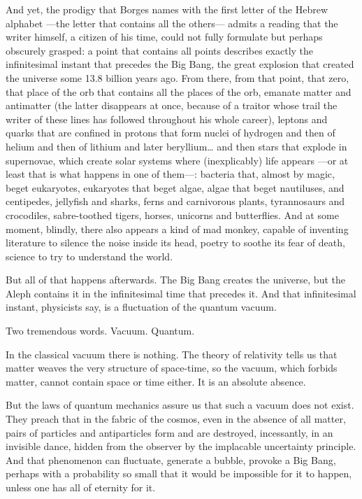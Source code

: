 \documentclass[11pt,a4paper]{article}
\begin{document}
And yet, the prodigy that Borges names with the first letter of the Hebrew alphabet ---the letter that contains all the others--- admits a reading that the writer himself, a citizen of his time, could not fully formulate but perhaps obscurely grasped: a point that contains all points describes exactly the infinitesimal instant that precedes the Big Bang, the great explosion that created the universe some 13.8 billion years ago. From there, from that point, that zero, that place of the orb that contains all the places of the orb, emanate matter and antimatter (the latter disappears at once, because of a traitor whose trail the writer of these lines has followed throughout his whole career), leptons and quarks that are confined in protons that form nuclei of hydrogen and then of helium and then of lithium and later beryllium… and then stars that explode in supernovae, which create solar systems where (inexplicably) life appears ---or at least that is what happens in one of them---: bacteria that, almost by magic, beget eukaryotes, eukaryotes that beget algae, algae that beget nautiluses, and centipedes, jellyfish and sharks, ferns and carnivorous plants, tyrannosaurs and crocodiles, sabre-toothed tigers, horses, unicorns and butterflies. And at some moment, blindly, there also appears a kind of mad monkey, capable of inventing literature to silence the noise inside its head, poetry to soothe its fear of death, science to try to understand the world.

But all of that happens afterwards. The Big Bang creates the universe, but the Aleph contains it in the infinitesimal time that precedes it. And that infinitesimal instant, physicists say, is a fluctuation of the quantum vacuum.

Two tremendous words. Vacuum. Quantum.

In the classical vacuum there is nothing. The theory of relativity tells us that matter weaves the very structure of space-time, so the vacuum, which forbids matter, cannot contain space or time either. It is an absolute absence.

But the laws of quantum mechanics assure us that such a vacuum does not exist. They preach that in the fabric of the cosmos, even in the absence of all matter, pairs of particles and antiparticles form and are destroyed, incessantly, in an invisible dance, hidden from the observer by the implacable uncertainty principle. And that phenomenon can fluctuate, generate a bubble, provoke a Big Bang, perhaps with a probability so small that it would be impossible for it to happen, unless one has all of eternity for it.
\end{document}
